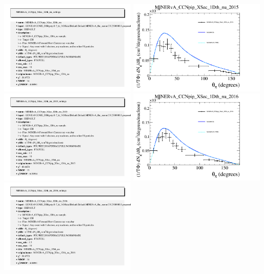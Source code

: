\documentclass{article}
\begin{document}
\includegraphics[width=0.49\textwidth]{figures/nuisance_MINERvA_CCNpip_XSec_1Dth_nu_info.png}
\centering
\includegraphics[width=0.49\textwidth]{figures/nuisance_MINERvA_CCNpip_XSec_1Dth_nu_2015_comp.png}
\includegraphics[width=0.49\textwidth]{figures/nuisance_MINERvA_CCNpip_XSec_1Dth_nu_2015_info.png}
\centering
\includegraphics[width=0.49\textwidth]{figures/nuisance_MINERvA_CCNpip_XSec_1Dth_nu_2016_comp.png}
\includegraphics[width=0.49\textwidth]{figures/nuisance_MINERvA_CCNpip_XSec_1Dth_nu_2016_info.png}
\end{document}
